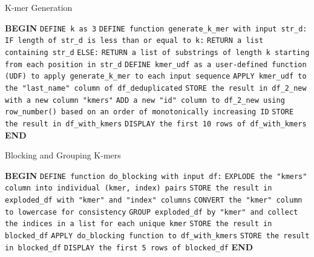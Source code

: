 \documentclass{article}
\begin{document}
\begin{algorithm}
\caption{K-mer Generation}
\begin{algorithmic}[1]
\State \textbf{BEGIN}
\State \hspace{1cm} \texttt{DEFINE k as 3}
\State \hspace{1cm} \texttt{DEFINE function generate\_k\_mer with input str\_d:}
\State \hspace{2cm} \texttt{IF length of str\_d is less than or equal to k:}
\State \hspace{3cm} \texttt{RETURN a list containing str\_d}
\State \hspace{2cm} \texttt{ELSE:}
\State \hspace{3cm} \texttt{RETURN a list of substrings of length k starting from each position in str\_d}
\State \hspace{1cm} \texttt{DEFINE kmer\_udf as a user-defined function (UDF) to apply generate\_k\_mer to each input sequence}
\State \hspace{1cm} \texttt{APPLY kmer\_udf to the "last\_name" column of df\_deduplicated}
\State \hspace{1cm} \texttt{STORE the result in df\_2\_new with a new column "kmers"}
\State \hspace{1cm} \texttt{ADD a new "id" column to df\_2\_new using row\_number() based on an order of monotonically increasing ID}
\State \hspace{1cm} \texttt{STORE the result in df\_with\_kmers}
\State \hspace{1cm} \texttt{DISPLAY the first 10 rows of df\_with\_kmers}
\State \textbf{END}
\end{algorithmic}
\end{algorithm}

\begin{algorithm}
\caption{Blocking and Grouping K-mers}
\begin{algorithmic}[1]
\State \textbf{BEGIN}
\State \hspace{1cm} \texttt{DEFINE function do\_blocking with input df:}
\State \hspace{2cm} \texttt{EXPLODE the "kmers" column into individual (kmer, index) pairs}
\State \hspace{2cm} \texttt{STORE the result in exploded\_df with "kmer" and "index" columns}
\State \hspace{2cm} \texttt{CONVERT the "kmer" column to lowercase for consistency}
\State \hspace{2cm} \texttt{GROUP exploded\_df by "kmer" and collect the indices in a list for each unique kmer}
\State \hspace{2cm} \texttt{STORE the result in blocked\_df}
\State \hspace{1cm} \texttt{APPLY do\_blocking function to df\_with\_kmers}
\State \hspace{1cm} \texttt{STORE the result in blocked\_df}
\State \hspace{1cm} \texttt{DISPLAY the first 5 rows of blocked\_df}
\State \textbf{END}
\end{algorithmic}
\end{algorithm}
\end{document}
